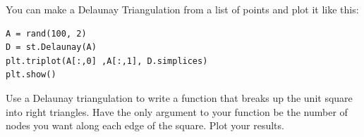 You can make a Delaunay Triangulation from a list of points and plot it like this:
\begin{lstlisting}
A = rand(100, 2)
D = st.Delaunay(A)
plt.triplot(A[:,0] ,A[:,1], D.simplices)
plt.show()
\end{lstlisting}

\begin{problem}
Use a Delaunay triangulation to write a function that breaks up the unit square into right triangles.
Have the only argument to your function be the number of nodes you want along each edge of the square.
Plot your results.
\end{problem}


